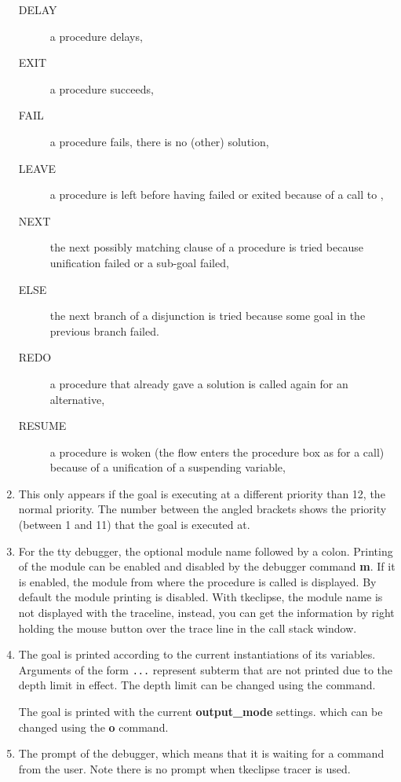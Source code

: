 \begin{enumerate}
\begin{description}
\item[DELAY] a procedure delays,

\item[EXIT] a procedure succeeds,

\item[FAIL] a procedure fails, there is no (other) solution,

\item[LEAVE] a procedure is left before having failed or exited because
of a call to ,

\item[NEXT] the next possibly matching clause of a procedure is tried
because unification failed or a sub-goal failed,

\item[ELSE] the next branch of a disjunction is tried because some goal
in the previous branch failed.

\item[REDO] a procedure that already gave a solution is called again for
an alternative,

\item[RESUME] a procedure is woken (the flow enters the procedure box as for
a call) because of a unification of a suspending variable,


\end{description}

\item This only appears if the goal is executing at a different priority
  than 12, the normal priority. The number between the angled brackets
  shows the priority (between 1 and 11) that the  goal is executed at. 

\item For the tty debugger, the optional module name followed by a colon.
Printing of the module can be enabled and disabled by the debugger
command {\bf m}. 
If it is enabled, the module from where the procedure is called is
displayed.  By default the module printing is disabled. With tkeclipse, the
module name is not displayed with the traceline, instead, you can get the
information by right holding the mouse button over the trace line in the
call stack window.

\item The goal is printed according to the current instantiations
of its variables.  Arguments of the form {\tt ...} represent subterm
that are not printed due to the depth limit in effect.
The depth limit can be changed using the
{\bf {\lt}} command.

The goal is printed with the current {\bf output_mode} settings.
which can be changed using the
{\bf o} command.

\item The prompt of the debugger, which means that it is waiting
for a command from the user. Note there is no prompt when tkeclipse tracer
is used.
\end{enumerate}

